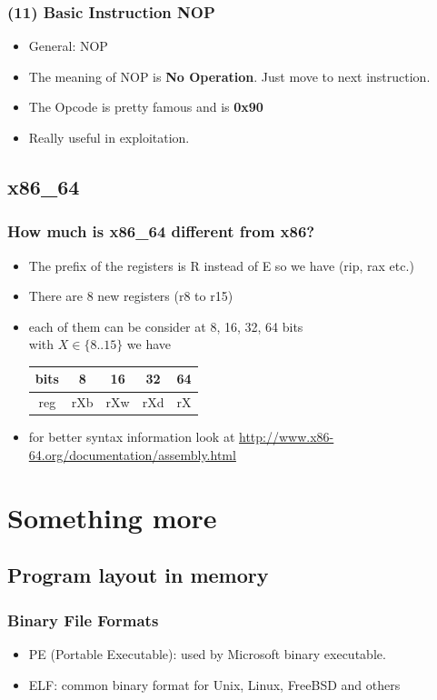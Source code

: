 \documentclass[]{beamer}
\newenvironment{changemargin}[2]{%
  \begin{list}{}{%
    \setlength{\topsep}{0pt}%
    \setlength{\leftmargin}{#1}%
    \setlength{\rightmargin}{#2}%
    \setlength{\listparindent}{\parindent}%
    \setlength{\itemindent}{\parindent}%
    \setlength{\parsep}{\parskip}%
  }%
  \item[]}{\end{list}}
\begin{document}
		\begin{frame}
			\frametitle{(11) Basic Instruction NOP}
				\begin{itemize}
					\item{General: NOP}\\
					\item{The meaning of NOP is \textbf{No Operation}. Just move to next instruction.} 
					\item{The Opcode is pretty famous and is \textbf{0x90}}
					\item{Really useful in exploitation.}
				\end{itemize}
		\end{frame}
			
	\subsection{x86\_64}
		\begin{frame}
			\frametitle{How much is x86\_64 different from x86?}
			\begin{changemargin}{-0.7cm}{0cm}
			\begin{itemize}
				\item{The prefix of  the registers is R instead of E so we have (rip, rax etc.)}
				\item{There are 8 new registers (r8 to r15)}
				\item{each of them can be consider at 8, 16, 32, 64 bits\\
				   with $X \in \{8..15\}$ we have }
				\begin{table}[h]
					\begin{tabular}{|c!{\vrule width 1pt }c|c|c|c|}
					\hline
					bits&8&16&32&64\\
					\hline
					reg&rXb&rXw&rXd&rX\\
					\hline	
					\end{tabular}
				\end{table}
				\item{for better syntax information look at \url{http://www.x86-64.org/documentation/assembly.html}}
			\end{itemize}
			\end{changemargin}
		\end{frame}
\section{Something more}
	\subsection{Program layout in memory}
		\begin{frame}
			\frametitle{Binary File Formats}
				\begin{itemize}
					\item{\color{red}PE (Portable Executable)\color{black}: used by Microsoft binary executable.}
					\item{\color{red}ELF\color{black}: common binary format for Unix, Linux, FreeBSD and others}
				\end{itemize}
		\end{frame}
	
\end{document}
